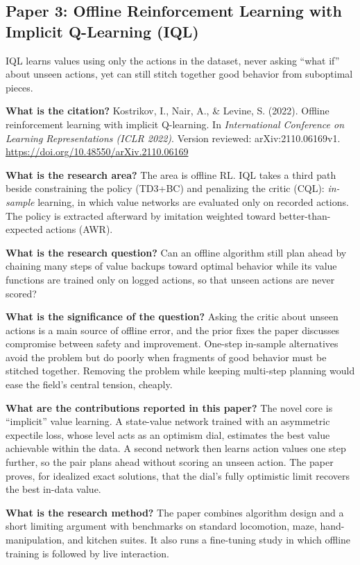 \documentclass[11pt]{article}
\newcommand{\paper}[1]{\subsection*{#1}}
\newcommand{\q}[2]{\item \textbf{#1} #2}
\begin{document}
\paper{Paper 3: Offline Reinforcement Learning with Implicit Q-Learning (IQL)}
IQL learns values using only the actions in the dataset, never asking ``what if'' about unseen actions, yet can still stitch together good behavior from suboptimal pieces.
\begin{qna}

\q{What is the citation?}
Kostrikov, I., Nair, A., \& Levine, S. (2022). Offline reinforcement learning with implicit Q-learning. In \emph{International Conference on Learning Representations (ICLR 2022)}. Version reviewed: arXiv:2110.06169v1. \url{https://doi.org/10.48550/arXiv.2110.06169}

\q{What is the research area?}
The area is offline RL. IQL takes a third path beside constraining the policy (TD3+BC) and penalizing the critic (CQL): \emph{in-sample} learning, in which value networks are evaluated only on recorded actions. The policy is extracted afterward by imitation weighted toward better-than-expected actions (AWR).

\q{What is the research question?}
Can an offline algorithm still plan ahead by chaining many steps of value backups toward optimal behavior while its value functions are trained only on logged actions, so that unseen actions are never scored?

\q{What is the significance of the question?}
Asking the critic about unseen actions is a main source of offline error, and the prior fixes the paper discusses compromise between safety and improvement. One-step in-sample alternatives avoid the problem but do poorly when fragments of good behavior must be stitched together. Removing the problem while keeping multi-step planning would ease the field's central tension, cheaply.

\q{What are the contributions reported in this paper?}
The novel core is ``implicit'' value learning. A state-value network trained with an asymmetric expectile loss, whose level acts as an optimism dial, estimates the best value achievable within the data. A second network then learns action values one step further, so the pair plans ahead without scoring an unseen action. The paper proves, for idealized exact solutions, that the dial's fully optimistic limit recovers the best in-data value.

\q{What is the research method?}
The paper combines algorithm design and a short limiting argument with benchmarks on standard locomotion, maze, hand-manipulation, and kitchen suites. It also runs a fine-tuning study in which offline training is followed by live interaction.


\end{qna}
\end{document}
